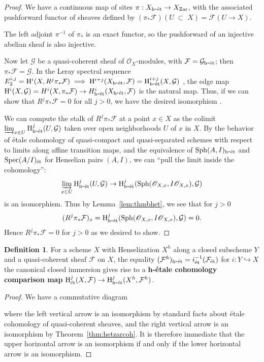 \documentclass[12pt]{article}
\renewcommand{\O}{\mathscr{O}}
\newcommand{\F}{\mathcal{F}}
\newcommand{\G}{\mathcal{G}}
\newcommand{\spec}{{\rm Spec}}
\newcommand{\sph}{{\rm Sph}}
\newcommand{\colim}{\varinjlim}
\newcommand{\Et}{\'etale\xspace}
\newcommand{\hetale}{h-\'etale\xspace}
\newcommand{\et}{{\rm\acute{e}t}}
\newcommand{\het}{{\rm h\mbox{-}\et}}
\newcommand{\zar}{{\rm Zar}}
\renewcommand{\H}{{\rm H}}
\newcommand{\spcite}[2]{\cite[\href{https://stacks.math.columbia.edu/tag/#1}{{#2} {#1}}]{stackp}}
\theoremstyle{definition}
\newtheorem{definition}[theorem]{Definition}
\numberwithin{equation}{subsection}
\begin{document}
\thmhetzarcoh
\begin{proof} We have a continuous map of sites $\pi: X_{\het} \to X_{\zar}$, with the associated pushforward functor of sheaves defined by $(\pi_*\F)(U \;\subset\; X) = \F(U \to X)$. 

The left adjoint $\pi^{-1}$ of $\pi_*$ is an exact functor, so the pushforward of an injective abelian sheaf is also injective.

Now let $\G$ be a quasi-coherent sheaf of $\O_X$-modules, with $\F=\G_{\het}$; then $\pi_*\F=\G$. In the Leray spectral sequence $E_2^{i,j}= \H^i(X,R^j\pi_*\F) \implies \H^{i+j}(X_{\het},\F) = \H^{i+j}_{\het}(X,\G)$ \spcite{0732}{Lemma}, the edge map $\H^i(X,\G) = H^i(X,\pi_*\F) \to H^i_{\het}(X_{\het},\F)$ is the natural map. Thus, if we can show that $R^j\pi_*\F=0$ for all $j > 0$, we have the desired isomorphism \spcite{0733}{Lemma}.


We can compute the stalk of $R^j\pi_*\F$ at a point $x \in X$ as the colimit $\colim_{x \in U} \H^j_{\het}(U,\G)$ taken over open neighborhoods $U$ of $x$ in $X$. By the behavior of \Et cohomology of quasi-compact and quasi-separated schemes with respect to limits along affine transition maps, and the equivalence of $\sph(A,I)_{\het}$ and $\spec(A/I)_{\et}$ for Henselian pairs $(A,I)$, we can ``pull the limit inside the cohomology'': $$\colim_{x \in U} \H^j_{\het}(U,\G) \to \H^j_{\het}(\sph(\O_{X,x},I\O_{X,x}),\G)$$ is an isomorphism. Thus by Lemma~\ref{lem:thmbhet}, we see that for $j>0$ $$(R^j\pi_*\F)_x=\H^j_{\het}(\sph(\O_{X,x},I\O_{X,x}),\G)=0.$$ Hence $R^j\pi_*\F=0$ for $j>0$ as we desired to show.\end{proof}



\begin{definition}\label{def:hetcmpsnmap}For a scheme $X$ with Henselization $X^h$ along a closed subscheme $Y$ and a quasi-coherent sheaf $\F$ on $X$, the equality $(\F^h)_{\het} = i_{\et}^{-1}(\F_{\et})$ for $i: Y \hookrightarrow X$ the canonical closed immersion gives rise to a {\bf \hetale cohomology comparison map} $\H^j_{\et}(X,\F) \to \H^j_{\het}(X^h,\F^h)$.
\end{definition}

\corhetzarcmpsn
\begin{proof} 

We have a commutative diagram 
\begin{center}
\end{center} \vspace{-.25in}
where the left vertical arrow is an isomorphism by standard facts about \Et cohomology of quasi-coherent sheaves, and the right vertical arrow is an isomorphism by Theorem~\ref{thm:hetzarcoh}. It is therefore immediate that the upper horizontal arrow is an isomorphism if and only if the lower horizontal arrow is an isomorphism.\end{proof}
\end{document}
